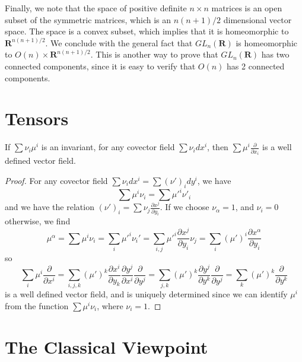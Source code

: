 \begin{example}
    Finally, we note that the space of positive definite $n \times n$ matrices is an open subset of the symmetric matrices, which is an $n(n+1)/2$ dimensional vector space. The space is a convex subset, which implies that it is homeomorphic to $\mathbf{R}^{n(n+1)/2}$. We conclude with the general fact that $GL_n(\mathbf{R})$ is homeomorphic to $O(n) \times \mathbf{R}^{n(n+1)/2}$. This is another way to prove that $GL_n(\mathbf{R})$ has two connected components, since it is easy to verify that $O(n)$ has 2 connected components.
\end{example}

\section{Tensors}

\begin{theorem}
    If $\sum \nu_i \mu^i$ is an invariant, for any covector field $\sum \nu_i dx^i$, then $\sum \mu^i \frac{\partial}{\partial x_i}$ is a well defined vector field.
\end{theorem}
\begin{proof}
    For any covector field $\sum \nu_i dx^i = \sum (\nu')_i dy^i$, we have
    \[ \sum \mu^i \nu_i = \sum \mu'^i \nu'_i \]
    and we have the relation $(\nu')_i = \sum \nu_j \frac{\partial x^j}{\partial y_i}$. If we choose $\nu_\alpha = 1$, and $\nu_i = 0$ otherwise, we find
    \[ \mu^\alpha = \sum \mu^i \nu_i = \sum_i \mu'^i \nu_i' = \sum_{i,j} \mu'^i \frac{\partial x^j}{\partial y_i} \nu_j = \sum_i (\mu')^i \frac{\partial x^\alpha}{\partial y_i} \]
    so
    \[ \sum_i \mu^i \frac{\partial}{\partial x^i} = \sum_{i,j,k} (\mu')^k \frac{\partial x^i}{\partial y_k} \frac{\partial y^j}{\partial x^i} \frac{\partial}{\partial y^j} = \sum_{j,k} (\mu')^k \frac{\partial y^j}{\partial y^k} \frac{\partial}{\partial y^j} = \sum_k (\mu')^k \frac{\partial}{\partial y^k} \]
    is a well defined vector field, and is uniquely determined since we can identify $\mu^i$ from the function $\sum \mu^i \nu_i$, where $\nu_i = 1$.
\end{proof}

\section{The Classical Viewpoint}

